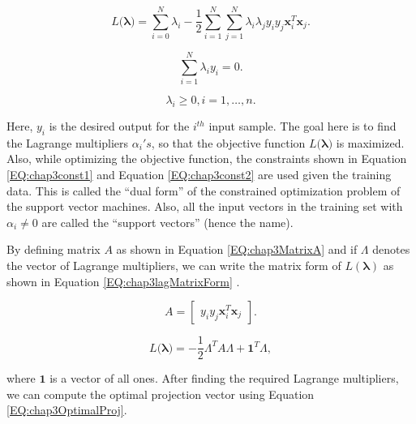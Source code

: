     \begin{equation}
    	L(\bm{\lambda)} = \sum_{i = 0}^{N} \lambda_i - \frac{1}{2} \sum_{i = 1}^{N} \sum_{j = 1}^{N} \lambda_i \lambda_j y_i y_j \mathbf{x}_i^{T} \mathbf{x}_j.
    	\label{EQ:chap3svmObj}
    \end{equation}
    
    \begin{equation}
    	\sum_{i = 1}^{N} \lambda_i y_i = 0.
    	\label{EQ:chap3const1}
    \end{equation}
    
    \begin{equation}
    	\lambda_i \geq 0, i = 1, \ldots ,n.
    	\label{EQ:chap3const2}
    \end{equation} 
    
	Here, $y_i$ is the desired output for the $i^{th}$ input sample. The goal here is to find the Lagrange multipliers $\alpha_i's$, so that the objective function $L(\bm{\lambda)}$ is maximized. Also, while optimizing the objective function, the constraints shown in Equation \ref{EQ:chap3const1} and Equation \ref{EQ:chap3const2} are used given the training data. This is called the ``dual form'' of the constrained optimization problem of the support vector machines. Also, all the input vectors in the training set with $\alpha_i \neq 0$ are called the ``support vectors'' (hence the name).
    
    By defining matrix $A$ as shown in Equation \ref{EQ:chap3MatrixA} and if $\Lambda$ denotes the vector of Lagrange multipliers, we can write the matrix form of $L(\mathbf{\lambda})$ as shown in Equation \ref{EQ:chap3lagMatrixForm} \cite{snyder2010machine}.
    
   	\begin{equation}
    	A = 
    	\begin{bmatrix}
	    	y_i y_j \mathbf{x}_i^T \mathbf{x}_j
    	\end{bmatrix}.
   		\label{EQ:chap3MatrixA}
   	\end{equation}
   
    
    \begin{equation}
    	L(\bm{\lambda)} = - \frac{1}{2} \Lambda^T A \Lambda + \mathbf{1}^T \Lambda,
    	\label{EQ:chap3lagMatrixForm}
    \end{equation}
    
   \noindent where $\mathbf{1}$ is a vector of all ones. After finding the required Lagrange multipliers, we can compute the optimal projection vector using Equation \ref{EQ:chap3OptimalProj}.
    
